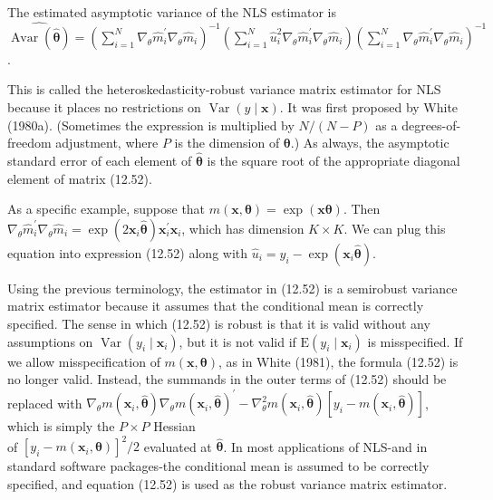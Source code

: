 \documentclass[10pt]{article}
\begin{document}
The estimated asymptotic variance of the NLS estimator is\\
$\widehat{\operatorname{Avar}(\hat{\boldsymbol{\theta}})}=\left(\sum_{i=1}^{N} \nabla_{\theta} \hat{m}_{i}^{\prime} \nabla_{\theta} \hat{m}_{i}\right)^{-1}\left(\sum_{i=1}^{N} \hat{u}_{i}^{2} \nabla_{\theta} \hat{m}_{i}^{\prime} \nabla_{\theta} \hat{m}_{i}\right)\left(\sum_{i=1}^{N} \nabla_{\theta} \hat{m}_{i}^{\prime} \nabla_{\theta} \hat{m}_{i}\right)^{-1}$.

This is called the heteroskedasticity-robust variance matrix estimator for NLS because it places no restrictions on $\operatorname{Var}(y \mid \mathbf{x})$. It was first proposed by White (1980a). (Sometimes the expression is multiplied by $N /(N-P)$ as a degrees-of-freedom adjustment, where $P$ is the dimension of $\boldsymbol{\theta}$.) As always, the asymptotic standard error of each element of $\hat{\boldsymbol{\theta}}$ is the square root of the appropriate diagonal element of matrix (12.52).

As a specific example, suppose that $m(\mathbf{x}, \boldsymbol{\theta})=\exp (\mathbf{x} \boldsymbol{\theta})$. Then $\nabla_{\theta} \hat{m}_{i}^{\prime} \nabla_{\theta} \hat{m}_{i}= \exp \left(2 \mathbf{x}_{i} \hat{\boldsymbol{\theta}}\right) \mathbf{x}_{i}^{\prime} \mathbf{x}_{i}$, which has dimension $K \times K$. We can plug this equation into expression (12.52) along with $\hat{u}_{i}=y_{i}-\exp \left(\mathbf{x}_{i} \hat{\boldsymbol{\theta}}\right)$.

Using the previous terminology, the estimator in (12.52) is a semirobust variance matrix estimator because it assumes that the conditional mean is correctly specified. The sense in which (12.52) is robust is that it is valid without any assumptions on $\operatorname{Var}\left(y_{i} \mid \mathbf{x}_{i}\right)$, but it is not valid if $\mathrm{E}\left(y_{i} \mid \mathbf{x}_{i}\right)$ is misspecified. If we allow misspecification of $m(\mathbf{x}, \boldsymbol{\theta})$, as in White (1981), the formula (12.52) is no longer valid. Instead, the summands in the outer terms of (12.52) should be replaced with $\nabla_{\theta} m\left(\mathbf{x}_{i}, \hat{\boldsymbol{\theta}}\right) \nabla_{\theta} m\left(\mathbf{x}_{i}, \hat{\boldsymbol{\theta}}\right)^{\prime}-\nabla_{\theta}^{2} m\left(\mathbf{x}_{i}, \hat{\boldsymbol{\theta}}\right)\left[y_{i}-m\left(\mathbf{x}_{i}, \hat{\boldsymbol{\theta}}\right)\right]$, which is simply the $P \times P$ Hessian\\
of $\left[y_{i}-m\left(\mathbf{x}_{i}, \boldsymbol{\theta}\right)\right]^{2} / 2$ evaluated at $\hat{\boldsymbol{\theta}}$. In most applications of NLS-and in standard software packages-the conditional mean is assumed to be correctly specified, and equation (12.52) is used as the robust variance matrix estimator.
\end{document}
